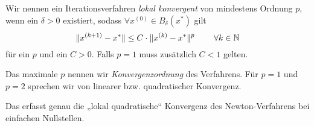 \documentclass[
]{mycourse}
\begin{document}
\begin{df}[Konvergenzordnung] \label{3.11}
	Wir nennen ein Iterationsverfahren \emph{lokal konvergent} von mindestens Ordnung $p$, wenn ein $\delta > 0$ existiert, sodass $\forall x^{(0)} \in B_\delta(x^*)$ gilt
	\[
		\|x^{(k+1)} - x^*\| \le C \cdot \|x^{(k)} - x^*\|^p
		\qquad \forall k\in \N
	\]
	für ein $p$ und ein $C > 0$.
	Falls $p=1$ muss zusätzlich $C < 1$ gelten.

	Das maximale $p$ nennen wir \emph{Konvergenzordnung} des Verfahrens.
	Für $p=1$ und $p=2$ sprechen wir von linearer bzw. quadratischer Konvergenz.
	\begin{note}
		Das erfasst genau die „lokal quadratische“ Konvergenz des Newton-Verfahrens bei einfachen Nullstellen.
	\end{note}
\end{df}
\end{document}
